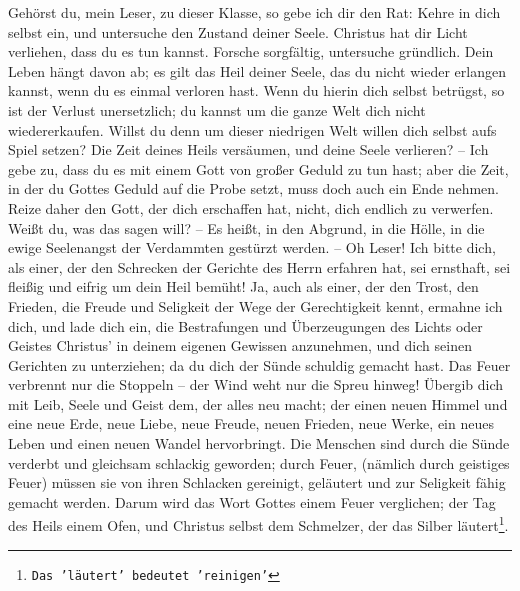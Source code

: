 Gehörst du, mein Leser, zu dieser Klasse, so gebe ich dir den Rat: Kehre in dich
selbst ein, und untersuche den Zustand deiner Seele. Christus hat dir Licht
verliehen, dass du es tun kannst. Forsche sorgfältig, untersuche gründlich. Dein
Leben hängt davon ab; es gilt das Heil deiner Seele, das du nicht wieder
erlangen kannst, wenn du es einmal verloren hast. Wenn du hierin dich selbst
betrügst, so ist der Verlust unersetzlich; du kannst um die ganze Welt dich
nicht wiedererkaufen. Willst du denn um dieser niedrigen Welt willen dich selbst
aufs Spiel setzen? Die Zeit deines Heils versäumen, und deine Seele verlieren?
-- Ich gebe zu, dass du es mit einem Gott von großer Geduld zu tun hast; aber
die Zeit, in der du Gottes Geduld auf die Probe setzt, muss doch auch ein Ende
nehmen. Reize daher den Gott, der dich erschaffen hat, nicht, dich endlich zu
verwerfen. Weißt du, was das sagen will? -- Es heißt, in den Abgrund, in die
Hölle, in die ewige Seelenangst der Verdammten gestürzt werden. -- Oh Leser! Ich
bitte dich, als einer, der den Schrecken der Gerichte des Herrn erfahren hat,
sei ernsthaft, sei fleißig und eifrig um dein Heil bemüht! Ja, auch als einer,
der den Trost, den Frieden, die Freude und Seligkeit der Wege der Gerechtigkeit
kennt, ermahne ich dich, und lade dich ein, die Bestrafungen und Überzeugungen
des Lichts oder Geistes Christus' in deinem eigenen Gewissen anzunehmen, und
dich seinen Gerichten zu unterziehen; da du dich der Sünde schuldig gemacht
hast. Das Feuer verbrennt nur die Stoppeln -- der Wind weht nur die Spreu
hinweg! Übergib dich mit Leib, Seele und Geist dem, der alles neu macht; der
einen neuen Himmel und eine neue Erde, neue Liebe, neue Freude, neuen Frieden,
neue Werke, ein neues Leben und einen neuen Wandel hervorbringt. Die Menschen
sind durch die Sünde verderbt und gleichsam schlackig geworden; durch Feuer,
(nämlich durch geistiges Feuer) müssen sie von ihren Schlacken gereinigt,
geläutert und zur Seligkeit fähig gemacht werden. Darum wird das Wort Gottes
einem Feuer verglichen; der Tag des Heils einem Ofen, und Christus selbst dem
Schmelzer, der das Silber läutert\footnote{\texttt{Das 'läutert' bedeutet
'reinigen'}}.

\medskip

